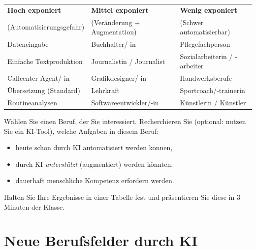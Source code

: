 \begin{myoverview}
\begin{center}
\begin{tabular}{p{4cm}p{4cm}p{5cm}}
    \toprule
    \textbf{Hoch exponiert}      & \textbf{Mittel exponiert}     & \textbf{Wenig exponiert}      \\
    (Automatisierungsgefahr)     & (Veränderung + Augmentation)  & (Schwer automatisierbar)      \\
    \midrule
    Dateneingabe                 & Buchhalter/-in                & Pflegefachperson              \\
    Einfache Textproduktion      & Journalistin / Journalist     & Sozialarbeiterin / -arbeiter  \\
    Callcenter-Agent/-in         & Grafikdesigner/-in            & Handwerksberufe               \\
    Übersetzung (Standard)       & Lehrkraft                     & Sportcoach/-trainerin         \\
    Routineanalysen              & Softwareentwickler/-in        & Künstlerin / Künstler         \\
    \bottomrule
\end{tabular}
\end{center}
\end{myoverview}

\begin{myexercise}[Berufsanalyse]
Wählen Sie einen Beruf, der Sie interessiert. Recherchieren Sie (optional: nutzen
Sie ein KI-Tool), welche Aufgaben in diesem Beruf:
\begin{itemize}
    \item heute schon durch KI automatisiert werden können,
    \item durch KI \emph{unterstützt} (augmentiert) werden könnten,
    \item dauerhaft menschliche Kompetenz erfordern werden.
\end{itemize}

Halten Sie Ihre Ergebnisse in einer Tabelle fest und präsentieren Sie diese
in 3 Minuten der Klasse.
\end{myexercise}

\section{Neue Berufsfelder durch KI}

